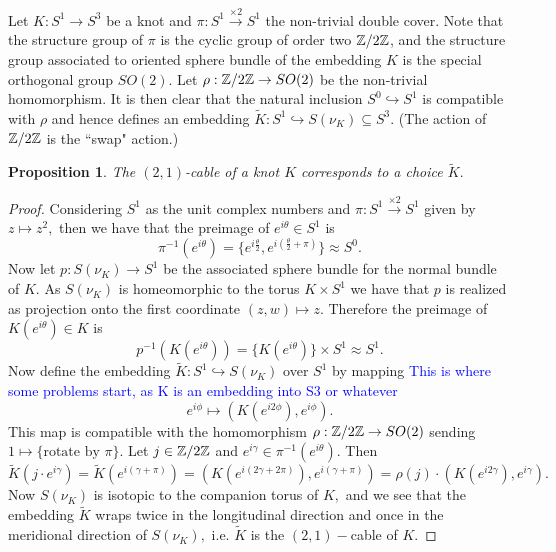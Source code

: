 \documentclass[a4paper, 12 pt, reqno]{amsart}
\newtheorem{prop}[theorem]{Proposition}
\theoremstyle{definition}
\theoremstyle{remark}
\begin{document}
Let $K : S^1 \to S^3$ be a knot and $\pi : S^1 \xrightarrow{\times 2} S^1$ the non-trivial double cover.  Note that the structure group of $\pi$ is the cyclic group of order two $\mathbb Z/2\mathbb Z$, and the structure group associated to oriented sphere bundle of the embedding $K$ is the special orthogonal group $SO(2)$.  Let $\rho : \mathbb Z/2\mathbb Z \to SO(2)$ be the non-trivial homomorphism.  It is then clear that the natural inclusion $S^0 \hookrightarrow S^1$ is compatible with $\rho$ and hence defines an embedding $\widetilde{K} : S^1 \hookrightarrow S(\nu_K) \subseteq S^3$.  (The action of $\mathbb Z/2\mathbb Z$ is the ``swap" action.)

\begin{prop}
The $(2,1)$-cable of a knot $K$ corresponds to a choice $\widetilde{K}.$ %
\end{prop}

\begin{proof} %
Considering $S^{1}$ as the unit complex numbers and $\pi : S^1 \xrightarrow{\times 2} S^1$ given by $z \mapsto z^{2},$ then we have that the preimage of $e^{i\theta} \in S^{1}$ is $$\pi^{-1}(e^{i\theta}) = \{e^{i\frac{\theta}{2}}, e^{i(\frac{\theta}{2} + \pi)}\} \approx S^{0}.$$ Now let $p: S(\nu_{K}) \rightarrow S^{1}$ be the associated sphere bundle for the normal bundle of $K.$ As $S(\nu_{K})$ is homeomorphic to the torus $K \times S^{1}$ we have that $p$ is realized as projection onto the first coordinate $(z, w) \mapsto z.$ Therefore the preimage of $K(e^{i\theta}) \in K$ is $$p^{-1}(K(e^{i\theta})) = \{K(e^{i\theta}) \}\times S^{1} \approx S^{1}.$$ 
Now define the embedding $\widetilde{K} : S^{1} \hookrightarrow S(\nu_{K})$ over $S^{1}$ by mapping \textcolor{blue}{This is where some problems start, as K is an embedding into S3 or whatever}$$e^{i\phi} \mapsto (K(e^{i2\phi}), e^{i\phi}).$$ This map is compatible with the homomorphism $\rho: \mathbb Z/2\mathbb Z \rightarrow SO(2)$ sending $1 \mapsto \{\text{rotate by $\pi$}\}.$ Let $j \in \mathbb Z/2\mathbb Z$ and $e^{i\gamma} \in \pi^{-1}(e^{i\theta}).$ Then $$\widetilde{K}(j \cdot e^{i\gamma}) = \widetilde{K}(e^{i(\gamma + \pi)}) = (K(e^{i(2\gamma + 2\pi)}), e^{i(\gamma + \pi)}) = \rho(j) \cdot (K(e^{i2\gamma}), e^{i\gamma}).$$
Now $S(\nu_{K})$ is isotopic to the companion torus of $K,$ and we see that the embedding $\widetilde{K}$ wraps twice in the longitudinal direction and once in the meridional direction of $S(\nu_{K}),$ i.e. $\widetilde{K}$ is the $(2,1)-$cable of $K.$
\end{proof}
\end{document}
